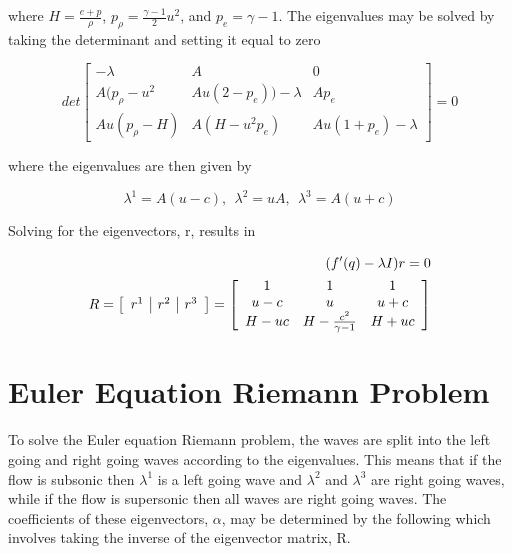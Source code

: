 \documentclass{article}%
\numberwithin{equation}{section}
\begin{document}
where $H = \frac{e + p}{\rho}$, $p_\rho = \frac{\gamma - 1}{2} u^2 $, and $p_e = \gamma - 1$. The eigenvalues may be solved by taking the determinant and setting it equal to zero

\begin{equation}
det \left[ \begin{array}{ccc} -\lambda & A & 0 \\ A (p_{\rho} - u^2 & A u(2 - p_e)) - \lambda & A p_e \\ A u(p_\rho - H) & A (H - u^2 p_e)  & A u(1 + p_e) - \lambda \end{array} \right] = 0
\end{equation}

where the eigenvalues are then given by 

\begin{equation}
\lambda^1 = A ( u - c),  \ \ \lambda^2 =u A, \ \ \lambda^3 = A (u + c) \label{eigval}
\end{equation}

Solving for the eigenvectors, r, results in

\begin{equation}
\begin{split}
(f'(q) - \lambda I) r = 0 \\
R = \left[ \begin{array}{c |c | c} r^1 & r^2 & r^3 \end{array} \right]= \left[ \begin{array}{ccc} 1 & 1 & 1 \\ u- c & u  & u + c \\ H - u c &  H - \frac{c^2}{\gamma - 1} & H + u c   \end{array} \right] 
\end{split}
\end{equation}

\section{Euler Equation Riemann Problem}
To solve the Euler equation Riemann problem, the waves are split into the left going and right going waves according to the eigenvalues. This means that if the flow is subsonic then $\lambda^1$ is a left going wave and $\lambda^2$ and $\lambda^3$ are right going waves, while if the flow is supersonic then all waves are right going waves. The coefficients of these eigenvectors, $\alpha$, may be determined by the following which involves taking the inverse of the eigenvector matrix, R.
\end{document}
